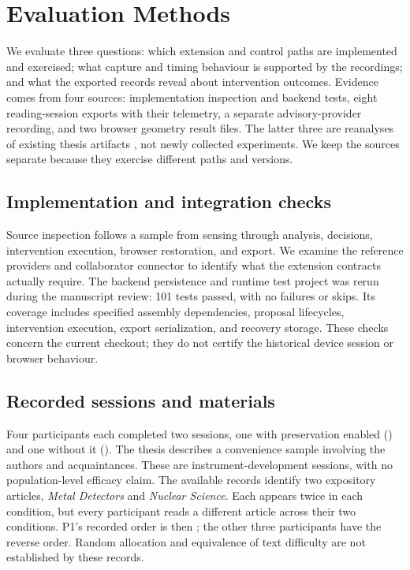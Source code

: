 \section{Evaluation Methods}
\label{sec:methods}

We evaluate three questions: which extension and control paths are implemented and exercised; what capture and timing behaviour is supported by the recordings; and what the exported records reveal about intervention outcomes. Evidence comes from four sources: implementation inspection and backend tests, eight reading-session exports with their telemetry, a separate advisory-provider recording, and two browser geometry result files. The latter three are reanalyses of existing thesis artifacts \citep{baral2026thesis}, not newly collected experiments. We keep the sources separate because they exercise different paths and versions.

\subsection{Implementation and integration checks}

Source inspection follows a sample from sensing through analysis, decisions, intervention execution, browser restoration, and export. We examine the reference providers and collaborator connector to identify what the extension contracts actually require. The backend persistence and runtime test project was rerun during the manuscript review: 101 tests passed, with no failures or skips. Its coverage includes specified assembly dependencies, proposal lifecycles, intervention execution, export serialization, and recovery storage. These checks concern the current checkout; they do not certify the historical device session or browser behaviour.

\subsection{Recorded sessions and materials}

Four participants each completed two sessions, one with preservation enabled (\on{}) and one without it (\off{}). The thesis describes a convenience sample involving the authors and acquaintances. These are instrument-development sessions, with no population-level efficacy claim. The available records identify two expository articles, \textit{Metal Detectors} and \textit{Nuclear Science}. Each appears twice in each condition, but every participant reads a different article across their two conditions. P1's recorded order is \on{} then \off{}; the other three participants have the reverse order. Random allocation and equivalence of text difficulty are not established by these records.

